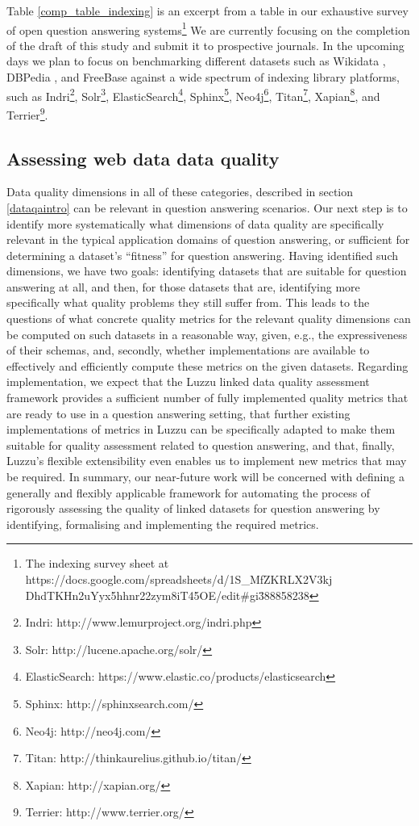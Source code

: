 \documentclass{article}
\begin{document}
Table \ref{comp_table_indexing} is an excerpt from a table in our exhaustive survey of open question answering systems\footnote{The indexing survey sheet at https://docs.google.com/spreadsheets/d/1S\_MfZKRLX2V3kj\\DhdTKHn2uYyx5hhnr22zym8iT45OE/edit\#gi\=388858238}
We are currently focusing on the completion of the draft of this study and submit it to prospective journals. In the upcoming days we plan to focus on benchmarking different datasets such as Wikidata \cite{vrandevcic2014wikidata}, DBPedia \cite{DBLP:conf/semweb/AuerBKLCI07}, and FreeBase \cite{DBLP:conf/aaai/BollackerCT07} against a wide spectrum of indexing library platforms, such as Indri\footnote{Indri: http://www.lemurproject.org/indri.php}, Solr\footnote{Solr: http://lucene.apache.org/solr/}, ElasticSearch\footnote{ElasticSearch: https://www.elastic.co/products/elasticsearch}, Sphinx\footnote{Sphinx: http://sphinxsearch.com/}, Neo4j\footnote{Neo4j: http://neo4j.com/}, Titan\footnote{Titan: http://thinkaurelius.github.io/titan/}, Xapian\footnote{Xapian: http://xapian.org/}, and Terrier\footnote{Terrier: http://www.terrier.org/}.


\subsection{Assessing web data data quality}
\label{dataqa}
Data quality dimensions in all of these categories, described in section \ref{dataqaintro} can be relevant in question answering scenarios. Our next step is to identify more systematically what dimensions of data quality are specifically relevant in the typical application domains of question answering, or sufficient for determining a dataset’s “fitness” for question answering. Having identified such dimensions, we have two goals: identifying datasets that are suitable for question answering at all, and then, for those datasets that are, identifying more specifically what quality problems they still suffer from. This leads to the questions of what concrete quality metrics for the relevant quality dimensions can be computed on such datasets in a reasonable way, given, e.g., the expressiveness of their schemas, and, secondly, whether implementations are available to effectively and efficiently compute these metrics on the given datasets. Regarding implementation, we expect that the Luzzu linked data quality assessment framework provides a sufficient number of fully implemented quality metrics that are ready to use in a question answering setting, that further existing implementations of metrics in Luzzu can be specifically adapted to make them suitable for quality assessment related to question answering, and that, finally, Luzzu’s flexible extensibility even enables us to implement new metrics that may be required. In summary, our near-future work will be concerned with defining a generally and flexibly applicable framework for automating the process of rigorously assessing the quality of linked datasets for question answering by identifying, formalising and implementing the required metrics.
\end{document}

